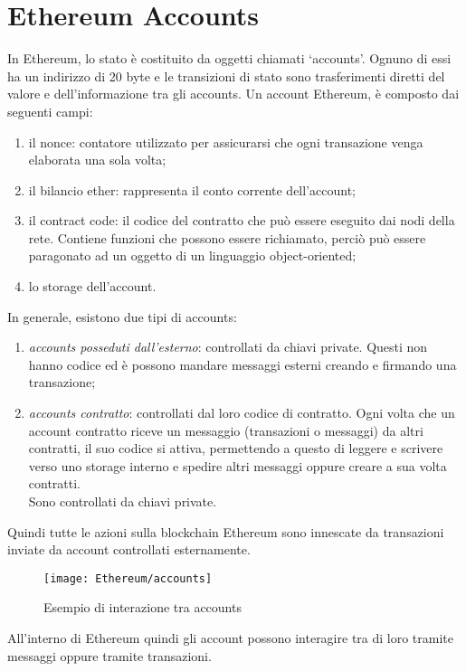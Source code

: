 \section{Ethereum Accounts} 
%
In Ethereum, lo stato è costituito da oggetti chiamati \enquote*{accounts}. Ognuno di essi ha un indirizzo di 20 byte e le transizioni di stato sono trasferimenti diretti del valore e dell'informazione tra gli accounts. Un account Ethereum, è composto dai seguenti campi:
\begin{enumerate}
	\item il nonce: contatore utilizzato per assicurarsi che ogni transazione venga elaborata una sola volta;
	\item il bilancio ether: rappresenta il conto corrente dell'account;
	\item il contract code: il codice del contratto che può essere eseguito dai nodi della rete. Contiene funzioni che possono essere richiamato, perciò può essere paragonato ad un oggetto di un linguaggio object-oriented;
	\item lo storage dell'account.
\end{enumerate}%
In generale, esistono due tipi di accounts:
\begin{enumerate}
	\item \emph{accounts posseduti dall'esterno}: controllati da chiavi private. Questi non hanno codice ed è possono mandare messaggi esterni creando e firmando una transazione;
	\item \emph{accounts contratto}: controllati dal loro codice di contratto. Ogni volta che un account contratto riceve un messaggio (transazioni o messaggi) da altri contratti, il suo codice si attiva, permettendo a questo di leggere e scrivere verso uno storage interno e spedire altri messaggi oppure creare a sua volta contratti. \\ Sono controllati da chiavi private.
\end{enumerate}%
Quindi tutte le azioni sulla blockchain Ethereum sono innescate da transazioni inviate da account controllati esternamente. 
\begin{center}
	\begin{figure}[H]
		\centering
		\texttt{[image: Ethereum/accounts]}
		\caption{Esempio di interazione tra accounts}
		\label{fig:esempio di interazione tra accounts}
	\end{figure}
\end{center}
All'interno di Ethereum quindi gli account possono interagire tra di loro tramite messaggi oppure tramite transazioni.
%
